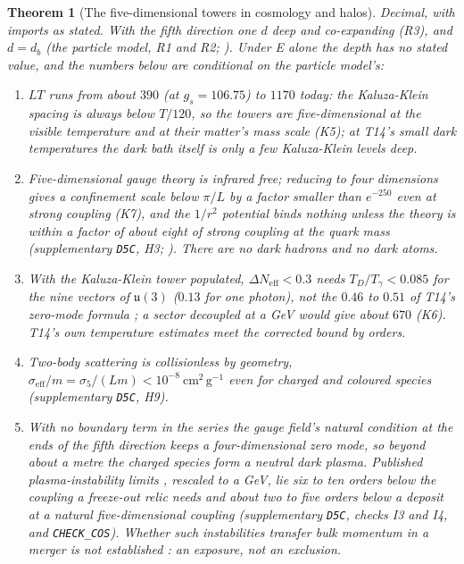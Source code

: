 \documentclass[11pt]{article}
\newtheorem{theorem}{Theorem}[section]
\theoremstyle{definition}
\theoremstyle{plain}
\newcommand{\changedmark}[2]{\marginpar{\raggedright\scriptsize\color{#1}#2}}
\providecommand{\Neff}{}\renewcommand{\Neff}{N_{\mathrm{eff}}}
\providecommand{\uu}{}\renewcommand{\uu}{\mathfrak{u}}
\providecommand{\file}{}\renewcommand{\file}[1]{\texttt{#1}}
\begin{document}
\begin{theorem}[The five-dimensional towers in cosmology and halos]\label{c:dark-tower-matter.five-dimensional-towers}
\changedmark{BurntOrange}{changed since the deposit}
Decimal, with imports as stated. With the fifth direction one $d$ deep and co-expanding (R3), and $d = d_{b}$ (the particle model, R1 and R2; \cite[Prem.~7.4, Rem.~7.9, Rem.~7.14]{ButlerT14}). Under E alone the depth has no stated value, and the numbers below are conditional on the particle model's:
\begin{enumerate}
\item[(i)] $LT$ runs from about $390$ (at $g_{s} = 106.75$) to $1170$ today: the Kaluza-Klein spacing is always below $T/120$, so the towers are five-dimensional at the visible temperature and at their matter's mass scale (K5); at T14's small dark temperatures the dark bath itself is only a few Kaluza-Klein levels deep.
\item[(ii)] Five-dimensional gauge theory is infrared free; reducing to four dimensions gives a confinement scale below $\pi/L$ by a factor smaller than $e^{-250}$ even at strong coupling (K7), and the $1/r^{2}$ potential binds nothing unless the theory is within a factor of about eight of strong coupling at the quark mass (supplementary \file{D5C}, H3; \cite{CLP2000}). There are no dark hadrons and no dark atoms.
\item[(iii)] With the Kaluza-Klein tower populated, $\Delta\Neff < 0.3$ needs $T_{D}/T_{\gamma} < 0.085$ for the nine vectors of $\uu(3)$ ($0.13$ for one photon), not the $0.46$ to $0.51$ of T14's zero-mode formula \cite[Prop.~6.3]{ButlerT14}; a sector decoupled at a GeV would give about $670$ (K6). T14's own temperature estimates meet the corrected bound by orders.
\item[(iv)] Two-body scattering is collisionless by geometry, $\sigma_{\mathrm{eff}}/m = \sigma_{5}/(Lm) < 10^{-8}\ \mathrm{cm^{2}\,g^{-1}}$ even for charged and coloured species (supplementary \file{D5C}, H9).
\item[(v)] With no boundary term in the series the gauge field's natural condition at the ends of the fifth direction keeps a four-dimensional zero mode, so beyond about a metre the charged species form a neutral dark plasma. Published plasma-instability limits \cite{SSS2024, PIC2024}, rescaled to a GeV, lie six to ten orders below the coupling a freeze-out relic needs and about two to five orders below a deposit at a natural five-dimensional coupling (supplementary \file{D5C}, checks I3 and I4, and \file{CHECK\_COS}). Whether such instabilities transfer bulk momentum in a merger is not established \cite{Lasenby2020}: an exposure, not an exclusion.

\end{enumerate}
\end{theorem}
\end{document}
